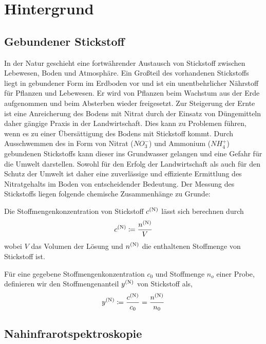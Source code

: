 \section{Hintergrund}
\label{sec:Hintergrund}

	\subsection{Gebundener Stickstoff}
	\label{ssec:Gebundener Stickstoff}

	In der Natur geschieht eine fortwährender Austausch von Stickstoff zwischen Lebewesen, Boden und Atmosphäre.
	Ein Großteil des vorhandenen Stickstoffs liegt in gebundener Form im Erdboden vor und ist ein unentbehrlicher Nährstoff für Pflanzen und Lebewesen.
	Er wird von Pflanzen beim Wachstum aus der Erde aufgenommen und beim Absterben wieder freigesetzt.
    Zur Steigerung der Ernte ist eine Anreicherung des Bodens mit Nitrat durch der Einsatz von Düngemitteln daher gängige Praxis in der Landwirtschaft.\cite{Umweltbundesamt2017}
    Dies kann zu Problemen führen, wenn es zu einer Übersättigung des Bodens mit Stickstoff kommt.
    Durch Ausschwemmen des in Form von Nitrat ($NO_3^-$) und Ammonium ($NH_4^+$) gebundenen Stickstoffs kann dieser ins Grundwasser gelangen und eine Gefahr für die Umwelt darstellen.
    Sowohl für den Erfolg der Landwirtschaft als auch für den Schutz der Umwelt ist daher eine zuverlässige und effiziente Ermittlung des Nitratgehalts im Boden von entscheidender Bedeutung.
    Der Messung des Stickstoffs liegen folgende chemische Zusammenhänge zu Grunde:


    Die Stoffmengenkonzentration von Stickstoff $c^{\mathrm{(N)}}$ lässt sich berechnen durch
    	\[
			c^{\mathrm{(N)}} \coloneqq \frac{n^{\mathrm{(N)}}}{V}
		\]
		wobei $V$ das Volumen der Lösung und $n^{\mathrm{(N)}}$ die enthaltenen Stoffmenge von Stickstoff ist.

    Für eine gegebene Stoffmengenkonzentration $c_0$ und Stoffmenge $n_o$ einer Probe, definieren wir den Stoffmengenanteil $y^{\mathrm{(N)}}$ von Stickstoff als,
        \[
			y^{\mathrm{(N)}} \coloneqq \frac{c^{\mathrm{(N)}}}{c_0} = \frac{n^{\mathrm{(N)}}}{n_0}
		\]


	\subsection{Nahinfrarotspektroskopie}
	\label{ssec:Nahinfrarotspek}


